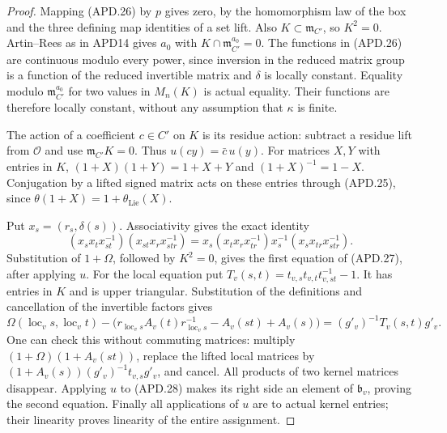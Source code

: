 \begin{proof}
Mapping (APD.26) by \(p\) gives zero, by the homomorphism law
of the box and the three defining map identities of a set lift.
Also \(K\subset\mathfrak m_{C'}\), so \(K^2=0\).
Artin--Rees as in APD14 gives \(a_0\) with
\(K\cap\mathfrak m_{C'}^{a_0}=0\).  The functions in (APD.26)
are continuous modulo every power, since inversion in the reduced
matrix group is a function of the reduced invertible matrix and
\(\delta\) is locally constant.  Equality modulo
\(\mathfrak m_{C'}^{a_0}\) for two values in \(M_n(K)\)
is actual equality.  Their functions are therefore locally
constant, without any assumption that \(\kappa\) is finite.

The action of a coefficient \(c\in C'\) on \(K\) is its
residue action: subtract a residue lift from \(\mathcal O\)
and use \(\mathfrak m_{C'}K=0\).  Thus \(u(cy)=\bar c\,u(y)\).
For matrices \(X,Y\) with entries in \(K\),
\((1+X)(1+Y)=1+X+Y\) and \((1+X)^{-1}=1-X\).
Conjugation by a lifted signed matrix acts on these entries
through (APD.25), since
\(\theta(1+X)=1+\theta_{\mathrm{Lie}}(X)\).

Put \(x_s=(r_s,\delta(s))\).  Associativity gives the exact
identity
\[
 (x_sx_tx_{st}^{-1})(x_{st}x_rx_{str}^{-1})
 =x_s(x_tx_rx_{tr}^{-1})x_s^{-1}(x_sx_{tr}x_{str}^{-1}).
\]
Substitution of \(1+\Omega\), followed by \(K^2=0\), gives
the first equation of (APD.27), after applying \(u\).
For the local equation put
\(T_v(s,t)=t_{v,s}t_{v,t}t_{v,st}^{-1}-1\).
It has entries in \(K\) and is upper triangular.  Substitution
of the definitions and cancellation of the invertible factors gives
\[
 \Omega(\operatorname{loc}_v s,\operatorname{loc}_v t)
 -\bigl(r_{\operatorname{loc}_v s}A_v(t)
             r_{\operatorname{loc}_v s}^{-1}
                 -A_v(st)+A_v(s)\bigr)
                 =(g'_v)^{-1}T_v(s,t)g'_v.                \tag{APD.28}
\]
One can check this without commuting matrices: multiply
\((1+\Omega)(1+A_v(st))\), replace the lifted local matrices
by \((1+A_v(s))(g'_v)^{-1}t_{v,s}g'_v\), and cancel.
All products of two kernel matrices disappear.  Applying \(u\)
to (APD.28) makes its right side an element of
\(\mathfrak b_v\), proving the second equation.  Finally all
applications of \(u\) are to actual kernel entries; their
linearity proves linearity of the entire assignment.
\end{proof}

